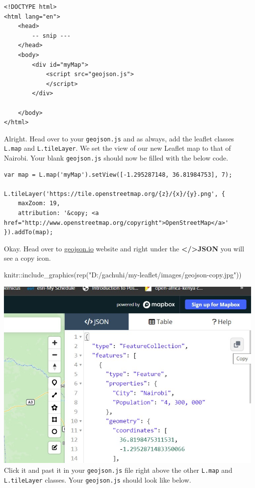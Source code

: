 \documentclass[
]{book}
\newenvironment{Shaded}{\begin{snugshade}}{\end{snugshade}}
\newcommand{\FunctionTok}[1]{\textcolor[rgb]{0.00,0.00,0.00}{#1}}
\newcommand{\NormalTok}[1]{#1}
\newcommand{\SpecialCharTok}[1]{\textcolor[rgb]{0.00,0.00,0.00}{#1}}
\newcommand{\StringTok}[1]{\textcolor[rgb]{0.31,0.60,0.02}{#1}}
\begin{document}
\begin{verbatim}
<!DOCTYPE html>
<html lang="en">
    <head>
        -- snip ---
    </head>
    <body>
        <div id="myMap">
            <script src="geojson.js">
            </script> 
        </div>  
        
    </body>
</html>
\end{verbatim}

Alright. Head over to your \texttt{geojson.js} and as always, add the leaflet classes \texttt{L.map} and \texttt{L.tileLayer}. We set the view of our new Leaflet map to that of Nairobi. Your blank \texttt{geojson.js} should now be filled with the below code.

\begin{verbatim}
var map = L.map('myMap').setView([-1.295287148, 36.81984753], 7);

L.tileLayer('https://tile.openstreetmap.org/{z}/{x}/{y}.png', {
    maxZoom: 19,
    attribution: '&copy; <a href="http://www.openstreetmap.org/copyright">OpenStreetMap</a>'
}).addTo(map);
\end{verbatim}

Okay. Head over to \url{geojson.io} website and right under the \textbf{\textless/\textgreater JSON} you will see a copy icon.

\begin{Shaded}
\begin{Highlighting}[]
\NormalTok{knitr}\SpecialCharTok{::}\FunctionTok{include\_graphics}\NormalTok{(}\FunctionTok{rep}\NormalTok{(}\StringTok{"D:/gachuhi/my{-}leaflet/images/geojson{-}copy.jpg"}\NormalTok{))}
\end{Highlighting}
\end{Shaded}

\includegraphics[width=10.29in]{../images/geojson-copy}
Click it and past it in your \texttt{geojson.js} file right above the other \texttt{L.map} and \texttt{L.tileLayer} classes. Your \texttt{geojson.js} should look like below.
\end{document}
